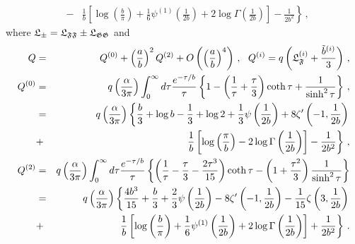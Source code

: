 \documentclass[12pt]{article}
\begin{document}
\begin{appendices}
\begin{eqnarray}
&-&\left. \frac{1}{b}\left[ \log \left( \frac{b}{\pi }\right) +\frac{1}{6}%
\psi ^{(1)}\left( \frac{1}{2b}\right) +2\log \Gamma \left( \frac{1}{2b}%
\right) \right] -\frac{1}{2b^{2}}\right\} \,,  \label{apb6}
\end{eqnarray}%
where $\mathfrak{L}_{\pm }=\mathfrak{L}_{\mathfrak{FF}}\pm \mathfrak{L}_{%
\mathfrak{GG}}$ and%
\begin{eqnarray}
Q &=&Q^{\left( 0\right) }+\left( \frac{a}{b}\right) ^{2}Q^{\left( 2\right)
}+O\left( \left( \frac{a}{b}\right) ^{4}\right) \,,\ \ Q^{\left( i\right)
}=q\left( \mathfrak{L}_{\mathfrak{F}}^{\left( i\right) }+\frac{\tilde{b}%
^{\left( i\right) }}{3}\right) \,,  \notag \\
Q^{\left( 0\right) } &=&q\left( \frac{\alpha }{3\pi }\right)
\int_{0}^{\infty }d\tau \frac{e^{-\tau /b}}{\tau }\left\{ 1-\left( \frac{1}{%
\tau }+\frac{\tau }{3}\right) \coth \tau +\frac{1}{\sinh ^{2}\tau }\right\}
\,,  \notag \\
&=&q\left( \frac{\alpha }{3\pi }\right) \left\{ \frac{b}{3}+\log b-\frac{1}{3%
}+\log 2+\frac{1}{3}\psi \left( \frac{1}{2b}\right) +8\zeta ^{\prime }\left(
-1,\frac{1}{2b}\right) \right.  \notag \\
&+&\left. \frac{1}{b}\left[ \log \left( \frac{\pi }{b}\right) -2\log \Gamma
\left( \frac{1}{2b}\right) \right] -\frac{1}{2b^{2}}\right\} \,,  \notag \\
Q^{\left( 2\right) } &=&q\left( \frac{\alpha }{3\pi }\right)
\int_{0}^{\infty }d\tau \frac{e^{-\tau /b}}{\tau }\left\{ \left( \frac{1}{%
\tau }-\frac{\tau }{3}-\frac{2\tau ^{3}}{15}\right) \coth \tau -\left( 1+%
\frac{\tau ^{2}}{3}\right) \frac{1}{\sinh ^{2}\tau }\right\}  \notag \\
&=&q\left( \frac{\alpha }{3\pi }\right) \left\{ \frac{4b^{3}}{15}+\frac{b}{3}%
+\frac{2}{3}\psi \left( \frac{1}{2b}\right) -8\zeta ^{\prime }\left( -1,%
\frac{1}{2b}\right) -\frac{1}{15}\zeta \left( 3,\frac{1}{2b}\right) \right. 
\notag \\
&+&\left. \frac{1}{b}\left[ \log \left( \frac{b}{\pi }\right) +\frac{1}{6}%
\psi ^{(1)}\left( \frac{1}{2b}\right) +2\log \Gamma \left( \frac{1}{2b}%
\right) \right] +\frac{1}{2b^{2}}\right\} \,.  \label{apb7}
\end{eqnarray}


\end{appendices}
\end{document}
